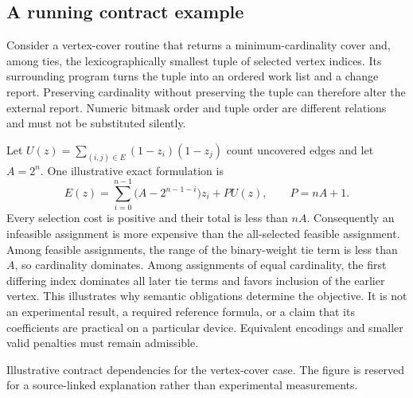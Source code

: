 \subsection{A running contract example}
Consider a vertex-cover routine that returns a minimum-cardinality cover and,
among ties, the lexicographically smallest tuple of selected vertex indices.
Its surrounding program turns the tuple into an ordered work list and a change
report. Preserving cardinality without preserving the tuple can therefore alter
the external report. Numeric bitmask order and tuple order are different
relations and must not be substituted silently.

Let $U(z)=\sum_{(i,j)\in E}(1-z_i)(1-z_j)$ count uncovered edges and let
$A=2^n$. One illustrative exact formulation is
\begin{equation}
 E(z)=\sum_{i=0}^{n-1}\bigl(A-2^{n-1-i}\bigr)z_i
       +P U(z),\qquad P=nA+1.
 \label{eq:cover}
\end{equation}
Every selection cost is positive and their total is less than $nA$. Consequently
an infeasible assignment is more expensive than the all-selected feasible
assignment. Among feasible assignments, the range of the binary-weight tie term
is less than $A$, so cardinality dominates. Among assignments of equal cardinality,
the first differing index dominates all later tie terms and favors inclusion of
the earlier vertex. This illustrates why semantic obligations determine the
objective. It is not an experimental result, a required reference formula, or a
claim that its coefficients are practical on a particular device. Equivalent
encodings and smaller valid penalties must remain admissible.

{Illustrative contract dependencies for the vertex-cover case. The figure is
reserved for a source-linked explanation rather than experimental measurements.}
